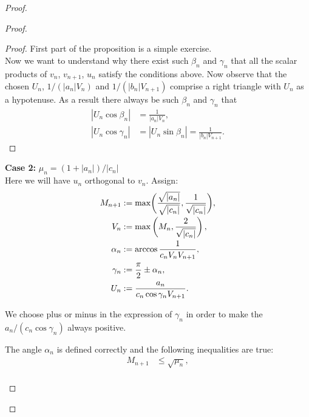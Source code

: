\documentclass[12pt]{amsart}
\theoremstyle{case}
\begin{document}
\begin{proof}
\begin{proof}
\begin{prop}
              \end{prop}
              \begin{proof}
                  First part of the proposition is a simple exercise.\\
                  Now we want to understand why there exist such $\beta_n$ and $\gamma_n$ that all the scalar products of
                  $v_n$, $v_{n+1}$, $u_n$ satisfy the conditions above.
                  Now observe that the chosen $U_n$, $1/(|a_n| V_n)$ and $1/(|b_n| V_{n+1})$ 
                  comprise a right triangle with $U_n$ as a hypotenuse.
                  As a result there always be such $\beta_n$ and $\gamma_n$ that
                  \begin{align*}
                      |U_n \cos{\beta_n}| &= \frac{1}{|a_n|V_n},\\
                      \left|U_n \cos{\gamma_n}\right| &= \left|U_n \sin{\beta_n}\right| = \frac{1}{|b_n|V_{n+1}}.
                  \end{align*}
              \end{proof}
          \noindent\textbf{Case 2:} $\mu_n = (1 + |a_n|)/|c_n|$\\
              Here we will have $u_n$ orthogonal to $v_n$.
              Assign:
              \begin{align*}
                  M_{n+1} &:= \max\biggl(\smash[b]{\frac{\sqrt{|a_n|}}{\sqrt{|c_n|}}}, \frac{1}{\sqrt{\smash[b]{|c_n|}}}\biggr),\\
                  V_n &:= \max\left(M_n, \frac{2}{\sqrt{\smash[b]{|c_n|}}}\right),\\
                  \alpha_n &:= \arccos{\frac{1}{c_n V_n V_{n+1}}},\\
                  \gamma_n &:= \frac{\pi}{2} \pm \alpha_n,\\
                  U_n &:= \frac{a_n}{c_n \cos{\gamma_n} V_{n+1}}.
              \end{align*}
              \begin{remark*}
                  We choose plus or minus in the expression of $\gamma_n$ in order to make the $a_n/(c_n \cos{\gamma_n})$ always positive.
              \end{remark*}
              \begin{prop}
                  The angle $\alpha_n$ is defined correctly and the following inequalities are true:
                  \begin{align*}
                      M_{n+1} &\leq \sqrt{\mu_n},\\

\end{align*}
\end{prop}
\end{proof}
\end{proof}
\end{document}
